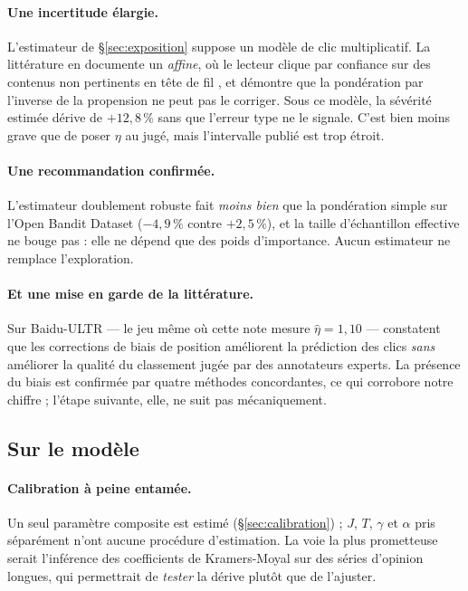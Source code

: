 \documentclass[11pt,a4paper]{article}
\begin{document}
\paragraph{Une incertitude élargie.} L'estimateur de \S\ref{sec:exposition} suppose un modèle de
clic multiplicatif. La littérature en documente un \emph{affine}, où le lecteur clique par
confiance sur des contenus non pertinents en tête de fil \citep{vardasbi2020}, et démontre que la
pondération par l'inverse de la propension ne peut pas le corriger. Sous ce modèle, la sévérité
estimée dérive de $+12{,}8\,\%$ sans que l'erreur type ne le signale. C'est bien moins grave que
de poser $\eta$ au jugé, mais l'intervalle publié est trop étroit.

\paragraph{Une recommandation confirmée.} L'estimateur doublement robuste fait \emph{moins bien}
que la pondération simple sur l'Open Bandit Dataset ($-4{,}9\,\%$ contre $+2{,}5\,\%$), et la
taille d'échantillon effective ne bouge pas : elle ne dépend que des poids d'importance. Aucun
estimateur ne remplace l'exploration.

\paragraph{Et une mise en garde de la littérature.} Sur Baidu-ULTR --- le jeu même où cette note
mesure $\hat\eta = 1{,}10$ --- \citet{hager2024} constatent que les corrections de biais de
position améliorent la prédiction des clics \emph{sans} améliorer la qualité du classement jugée
par des annotateurs experts. La présence du biais est confirmée par quatre méthodes concordantes,
ce qui corrobore notre chiffre ; l'étape suivante, elle, ne suit pas mécaniquement.

\subsection{Sur le modèle}

\paragraph{Calibration à peine entamée.} Un seul paramètre composite est estimé
(\S\ref{sec:calibration}) ; $J$, $T$, $\gamma$ et $\alpha$ pris séparément n'ont aucune
procédure d'estimation. La voie la plus prometteuse serait l'inférence des coefficients de
Kramers-Moyal sur des séries d'opinion longues, qui permettrait de \emph{tester} la dérive
plutôt que de l'ajuster.
\end{document}
